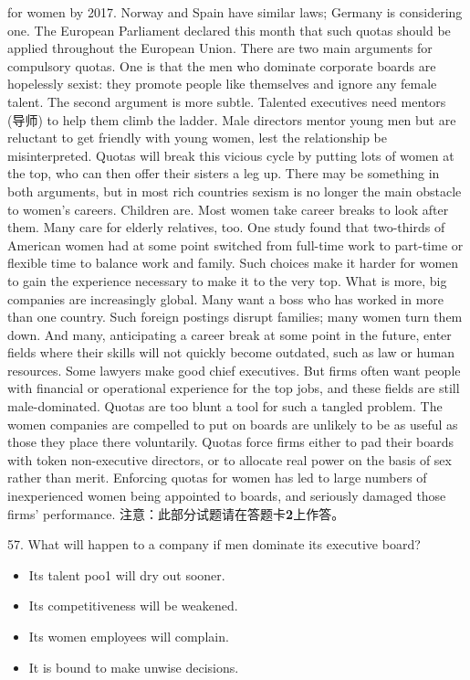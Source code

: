 \documentclass[UTF8,11pt]{ctexart}
\begin{document}
for women by 2017. Norway and Spain have similar laws; Germany is considering one. The European Parliament declared this month that such quotas should be applied throughout the European Union. There are two main arguments for compulsory quotas. One is that the men who dominate corporate boards are hopelessly sexist: they promote people like themselves and ignore any female talent. The second argument is more subtle. Talented executives need mentors (导师) to help them climb the ladder. Male directors mentor young men but are reluctant to get friendly with young women, lest the relationship be misinterpreted. Quotas will break this vicious cycle by putting lots of women at the top, who can then offer their sisters a leg up. There may be something in both arguments, but in most rich countries sexism is no longer the main obstacle to women's careers. Children are. Most women take career breaks to look after them. Many care for elderly relatives, too. One study found that two-thirds of American women had at some point switched from full-time work to part-time or flexible time to balance work and family. Such choices make it harder for women to gain the experience necessary to make it to the very top. What is more, big companies are increasingly global. Many want a boss who has worked in more than one country. Such foreign postings disrupt families; many women turn them down. And many, anticipating a career break at some point in the future, enter fields where their skills will not quickly become outdated, such as law or human resources. Some lawyers make good chief executives. But firms often want people with financial or operational experience for the top jobs, and these fields are still male-dominated. Quotas are too blunt a tool for such a tangled problem. The women companies are compelled to put on boards are unlikely to be as useful as those they place there voluntarily. Quotas force firms either to pad their boards with token non-executive directors, or to allocate real power on the basis of sex rather than merit. Enforcing quotas for women has led to large numbers of inexperienced women being appointed to boards, and seriously damaged those firms' performance. 注意：此部分试题请在答题卡\textbf{2}上作答。


57. What will happen to a company if men dominate its executive board?


\begin{itemize}[leftmargin=2em,itemsep=.2em,topsep=.4em]\item[A.] Its talent poo1 will dry out sooner.
\item[B.] Its competitiveness will be weakened.
\item[C.] Its women employees will complain.
\item[D.] It is bound to make unwise decisions.
\end{itemize}
\end{document}
